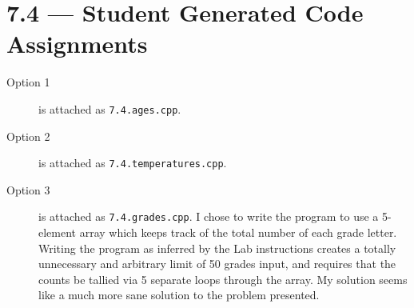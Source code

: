 \documentclass[11pt]{article}
\begin{document}
\section*{7.4 --- Student Generated Code Assignments}
\begin{description}
    \item[Option 1] is attached as \texttt{7.4.ages.cpp}.
    \item[Option 2] is attached as \texttt{7.4.temperatures.cpp}.
    \item[Option 3] is attached as \texttt{7.4.grades.cpp}. I chose to write the program to use a 5-element array which keeps track of the total number of each grade letter. Writing the program as inferred by the Lab instructions creates a totally unnecessary and arbitrary limit of 50 grades input, and requires that the counts be tallied via 5 separate loops through the array. My solution seems like a much more sane solution to the problem presented.
\end{description}
\end{document}
